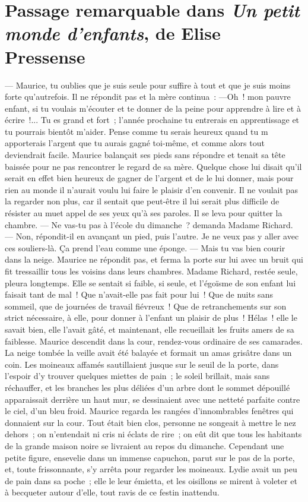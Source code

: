 \newpage 
\section{Passage remarquable dans \textit{Un petit monde d'enfants}, de Elise Pressense}\label{enfants}

 — Maurice, tu oublies que je suis seule pour suffire à tout et que je suis moins forte qu’autrefois.  Il ne répondit pas et la mère continua :  —Oh ! mon pauvre enfant, si tu voulais m’écouter et te donner de la peine pour apprendre à lire et à écrire !... Tu es grand et fort ; l’année prochaine tu entrerais en apprentissage et tu pourrais bientôt m’aider. Pense comme tu serais heureux quand tu m apporterais l’argent que tu aurais gagné toi-même, et comme alors tout deviendrait facile.  Maurice balançait ses pieds sans répondre et tenait sa tête baissée pour ne pas rencontrer le regard de sa mère. Quelque chose lui disait qu’il serait en effet bien heureux de gagner de l’argent et de le lui donner, mais pour rien au monde il n’aurait voulu lui faire le plaisir d’en convenir. Il ne voulait pas la regarder non plus, car il sentait que peut-être il lui serait plus difficile de résister au muet appel de ses yeux qu’à ses paroles. Il se leva pour quitter la chambre.  — Ne vas-tu pas à l’école du dimanche ? demanda Madame Richard.  — Non, répondit-il en avançant un pied, puis l’autre. Je ne veux pas y aller avec ces souliers-là. Ça prend l’eau comme une éponge.  — Mais tu vas bien courir dans la neige.  Maurice ne répondit pas, et ferma la porte sur lui avec un bruit qui fit tressaillir tous les voisins dans leurs chambres.  Madame Richard, restée seule, pleura longtemps. Elle se sentait si faible, si seule, et l’égoïsme de son enfant lui faisait tant de mal ! Que n’avait-elle pas fait pour lui ! Que de nuits sans sommeil, que de journées de travail fiévreux ! Que de retranchements sur son strict nécessaire, à elle, pour donner à l’enfant un plaisir de plus ! Hélas ! elle le savait bien, elle l’avait gâté, et maintenant, elle recueillait les fruits amers de sa faiblesse.  Maurice descendit dans la cour, rendez-vous ordinaire de ses camarades. La neige tombée la veille avait été balayée et formait un amas grisâtre dans un coin. Les moineaux affamés sautillaient jusque sur le seuil de la porte, dans l’espoir d’y trouver quelques miettes de pain ; le soleil brillait, mais sans réchauffer, et les branches les plus déliées d’un arbre dont le sommet dépouillé apparaissait derrière un haut mur, se dessinaient avec une netteté parfaite contre le ciel, d’un bleu froid.  Maurice regarda les rangées d’innombrables fenêtres qui donnaient sur la cour. Tout était bien clos, personne ne songeait à mettre le nez dehors ; on n’entendait ni cris ni éclats de rire ; on eût dit que tous les habitants de la grande maison noire se livraient au repos du dimanche.  Cependant une petite figure, ensevelie dans un immense capuchon, parut sur le pas de la porte, et, toute frissonnante, s’y arrêta pour regarder les moineaux. Lydie avait un peu de pain dans sa poche ; elle le leur émietta, et les oisillons se mirent à voleter et à becqueter autour d’elle, tout ravis de ce festin inattendu.




